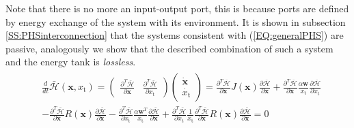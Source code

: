 \documentclass[a4paper,twoside, openright,12pt]{report}
\newcommand{\f}[1]{\boldsymbol{#1}}
\newcommand{\g}[1]{\text{#1}}
\begin{document}
Note that there is no more an input-output port, this is because ports are defined by energy exchange of the system with its environment. It is shown in subsection \ref{SS:PHSinterconnection} that the systems consistent with (\ref{EQ:generalPHS}) are passive, analogously we show that the described combination of such a system and the energy tank is \emph{lossless}.
\begin{eqnarray}
\begin{aligned}
&\frac{d}{dt}\bar{\mathcal{H}}(\f{x},x_\g{t}) = 
\begin{pmatrix}
\frac{\partial^T \bar{\mathcal{H}}}{\partial \f{x}} & \frac{\partial^T \bar{\mathcal{H}}}{\partial x_\g{t}}
\end{pmatrix}
\begin{pmatrix}
\dot{\f{x}} \\ \dot{x_\g{t}}
\end{pmatrix}
= \frac{\partial^T \bar{\mathcal{H}}}{\partial \f{x}}J(\f{x})\frac{\partial \bar{\mathcal{H}}}{\partial \f{x}} + \frac{\partial^T \bar{\mathcal{H}}}{\partial \f{x}}\frac{\alpha \f{w}}{x_\g{t}}\frac{\partial \bar{\mathcal{H}}}{\partial x_\g{t}} 
\\
&- \frac{\partial^T \bar{\mathcal{H}}}{\partial \f{x}}R(\f{x})\frac{\partial \bar{\mathcal{H}}}{\partial \f{x}} -\frac{\partial^T \bar{\mathcal{H}}}{\partial x_\g{t}}\frac{\alpha \f{w}^T}{x_\g{t}} \frac{\partial \bar{\mathcal{H}}}{\partial \f{x}} + \frac{\partial^T \bar{\mathcal{H}}}{\partial x_\g{t}}\frac{1}{x_\g{t}}\frac{\partial^T \bar{\mathcal{H}}}{\partial \f{x}}R(\f{x})\frac{\partial \bar{\mathcal{H}}}{\partial \f{x}} = 0
\end{aligned}
\end{eqnarray}

 
\end{document}
